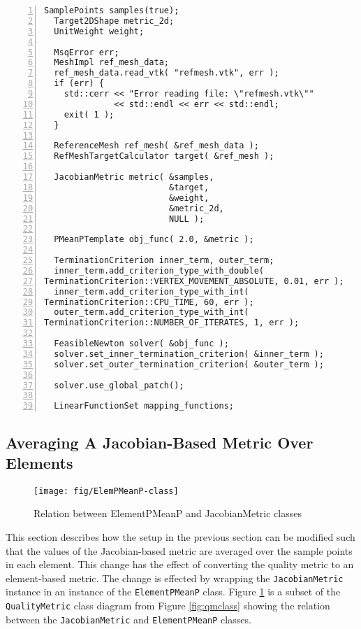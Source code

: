 \documentclass{article}
\begin{document}
\begin{lstlisting}[caption={Example Quality Improver with Jacobian-Based Metric},label={lst:jacobianex},numbers=left] 
  SamplePoints samples(true);
  Target2DShape metric_2d;
  UnitWeight weight;
  
  MsqError err;
  MeshImpl ref_mesh_data;
  ref_mesh_data.read_vtk( "refmesh.vtk", err );
  if (err) {
    std::cerr << "Error reading file: \"refmesh.vtk\""
              << std::endl << err << std::endl;
    exit( 1 );
  }
  
  ReferenceMesh ref_mesh( &ref_mesh_data );
  RefMeshTargetCalculator target( &ref_mesh );
  
  JacobianMetric metric( &samples,
                         &target,
                         &weight,
                         &metric_2d,
                         NULL );
  
  PMeanPTemplate obj_func( 2.0, &metric );
  
  TerminationCriterion inner_term, outer_term;
  inner_term.add_criterion_type_with_double( 
TerminationCriterion::VERTEX_MOVEMENT_ABSOLUTE, 0.01, err );
  inner_term.add_criterion_type_with_int( 
TerminationCriterion::CPU_TIME, 60, err );
  outer_term.add_criterion_type_with_int( 
TerminationCriterion::NUMBER_OF_ITERATES, 1, err );

  FeasibleNewton solver( &obj_func );
  solver.set_inner_termination_criterion( &inner_term );
  solver.set_outer_termination_criterion( &outer_term );
  
  solver.use_global_patch();
  
  LinearFunctionSet mapping_functions;
\end{lstlisting}

\subsection{Averaging A Jacobian-Based Metric Over Elements}

\begin{figure}[h]
\begin{center}
\texttt{[image: fig/ElemPMeanP-class]}
\caption{Relation between ElementPMeanP and JacobianMetric classes \label{fig:elempmeanp}}
\end{center}
\end{figure}

This section describes how the setup in the previous section can be modified such that the values of the Jacobian-based metric are averaged over the sample points in each element.  This change has the effect of converting the quality metric to an element-based metric.  The change is effected by wrapping the \texttt{JacobianMetric} instance in an instance of the \texttt{ElementPMeanP} class.  Figure \ref{fig:elempmeanp} is a subset of the \texttt{QualityMetric} class diagram from Figure \ref{fig:qmclass} showing the relation between the \texttt{JacobianMetric} and \texttt{ElementPMeanP} classes.
\end{document}
